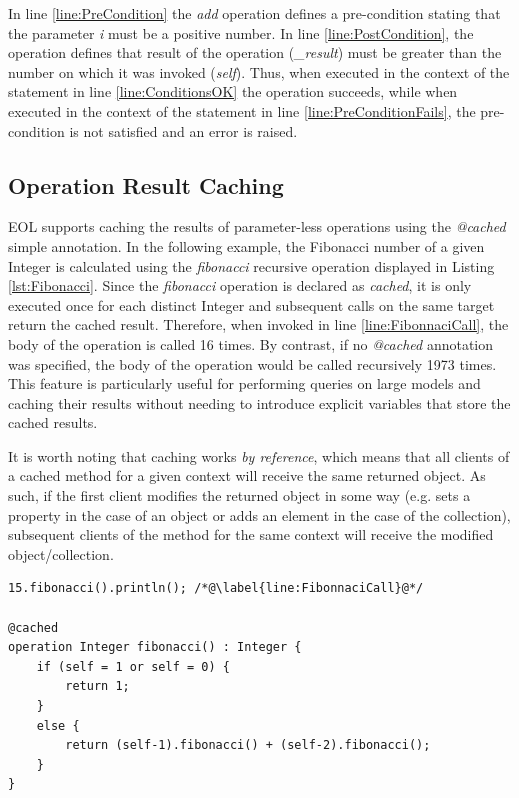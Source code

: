In line \ref{line:PreCondition} the \emph{add} operation defines a pre-condition stating that the parameter \emph{i} must be a positive number. In line \ref{line:PostCondition}, the operation defines that result of the operation (\emph{\_result}) must be greater than the number on which it was invoked (\emph{self}). Thus, when executed in the context of the statement in line \ref{line:ConditionsOK} the operation succeeds, while when executed in the context of the statement in line \ref{line:PreConditionFails}, the pre-condition is not satisfied and an error is raised. 

\subsection{Operation Result Caching}
\label{sec:EolCaching}

EOL supports caching the results of parameter-less operations using the \emph{@cached} simple annotation. In the following example, the Fibonacci number of a given Integer is calculated using the \emph{fibonacci} recursive operation displayed in Listing \ref{lst:Fibonacci}. Since the \emph{fibonacci} operation is declared as \emph{cached}, it is only executed once for each distinct Integer and subsequent calls on the same target return the cached result. Therefore, when invoked in line \ref{line:FibonnaciCall}, the body of the operation is called 16 times. By contrast, if no \emph{@cached} annotation was specified, the body of the operation would be called recursively 1973 times. This feature is particularly useful for performing queries on large models and caching their results without needing to introduce explicit variables that store the cached results. 

It is worth noting that caching works \emph{by reference}, which means that all clients of a cached method for a given context will receive the same returned object. As such, if the first client modifies the returned object in some way (e.g. sets a property in the case of an object or adds an element in the case of the collection), subsequent clients of the method for the same context will receive the modified object/collection.

\begin{lstlisting}[float=tbp, caption=Calculating the Fibonacci number using a cached operation, label=lst:Fibonacci, language=EOL]
15.fibonacci().println(); /*@\label{line:FibonnaciCall}@*/

@cached
operation Integer fibonacci() : Integer {
	if (self = 1 or self = 0) {
		return 1;
	}
	else {
		return (self-1).fibonacci() + (self-2).fibonacci();
	}
}
\end{lstlisting}

